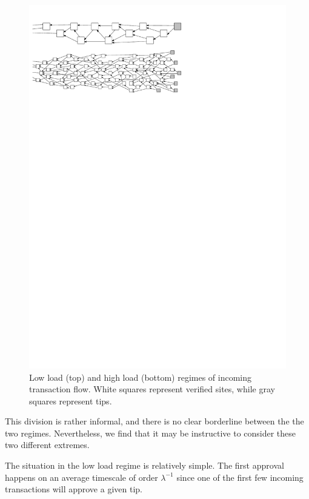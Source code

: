 \documentclass[12pt]{article}
\begin{document}
\begin{figure}
 \centering \includegraphics{regimes} 
\caption{Low load (top) and high load (bottom) regimes of 
incoming transaction flow. White squares represent verified 
sites, while gray squares represent tips.
}
\label{f_regimes}
\end{figure}
This division is rather informal, and there is no
clear borderline between the the two regimes. Nevertheless,
we find that it may be instructive to consider these
two 
different 
extremes.

The situation in the low load regime is relatively simple. The first approval
 happens on an average timescale of order $\lambda^{-1}$
since 
one of the first few 
incoming transactions will approve 
a given tip.
\end{document}
